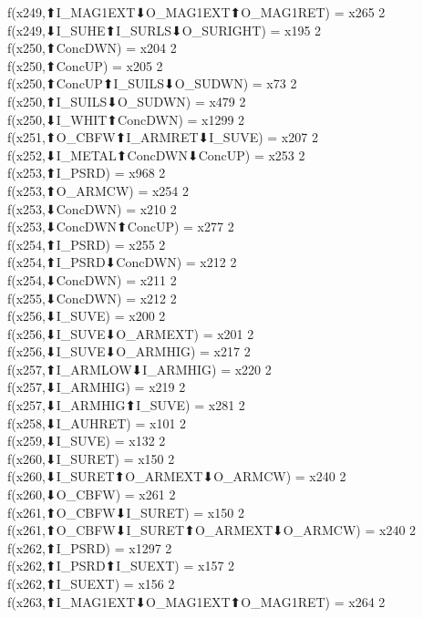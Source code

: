 f(x249,⬆I_MAG1EXT⬇O_MAG1EXT⬆O_MAG1RET) = x265 {2} \\
f(x249,⬇I_SUHE⬆I_SURLS⬇O_SURIGHT) = x195 {2} \\
f(x250,⬆ConcDWN) = x204 {2} \\
f(x250,⬆ConcUP) = x205 {2} \\
f(x250,⬆ConcUP⬆I_SUILS⬇O_SUDWN) = x73 {2} \\
f(x250,⬆I_SUILS⬇O_SUDWN) = x479 {2} \\
f(x250,⬇I_WHIT⬆ConcDWN) = x1299 {2} \\
f(x251,⬆O_CBFW⬆I_ARMRET⬇I_SUVE) = x207 {2} \\
f(x252,⬇I_METAL⬆ConcDWN⬇ConcUP) = x253 {2} \\
f(x253,⬆I_PSRD) = x968 {2} \\
f(x253,⬆O_ARMCW) = x254 {2} \\
f(x253,⬇ConcDWN) = x210 {2} \\
f(x253,⬇ConcDWN⬆ConcUP) = x277 {2} \\
f(x254,⬆I_PSRD) = x255 {2} \\
f(x254,⬆I_PSRD⬇ConcDWN) = x212 {2} \\
f(x254,⬇ConcDWN) = x211 {2} \\
f(x255,⬇ConcDWN) = x212 {2} \\
f(x256,⬇I_SUVE) = x200 {2} \\
f(x256,⬇I_SUVE⬇O_ARMEXT) = x201 {2} \\
f(x256,⬇I_SUVE⬇O_ARMHIG) = x217 {2} \\
f(x257,⬆I_ARMLOW⬇I_ARMHIG) = x220 {2} \\
f(x257,⬇I_ARMHIG) = x219 {2} \\
f(x257,⬇I_ARMHIG⬆I_SUVE) = x281 {2} \\
f(x258,⬇I_AUHRET) = x101 {2} \\
f(x259,⬇I_SUVE) = x132 {2} \\
f(x260,⬇I_SURET) = x150 {2} \\
f(x260,⬇I_SURET⬆O_ARMEXT⬇O_ARMCW) = x240 {2} \\
f(x260,⬇O_CBFW) = x261 {2} \\
f(x261,⬆O_CBFW⬇I_SURET) = x150 {2} \\
f(x261,⬆O_CBFW⬇I_SURET⬆O_ARMEXT⬇O_ARMCW) = x240 {2} \\
f(x262,⬆I_PSRD) = x1297 {2} \\
f(x262,⬆I_PSRD⬆I_SUEXT) = x157 {2} \\
f(x262,⬆I_SUEXT) = x156 {2} \\
f(x263,⬆I_MAG1EXT⬇O_MAG1EXT⬆O_MAG1RET) = x264 {2} \\
